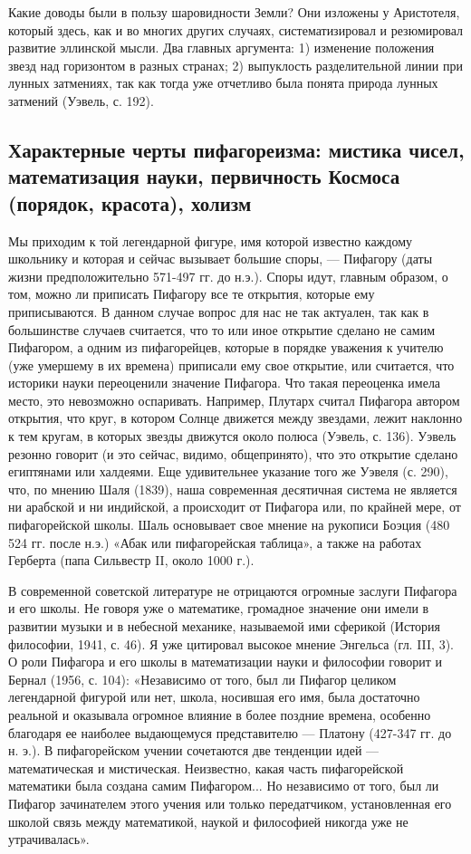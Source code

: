 Какие доводы были в пользу шаровидности Земли? Они изложены у
Аристотеля, который здесь, как и во многих других случаях,
систематизировал и резюмировал развитие эллинской мысли. Два главных
аргумента: 1) изменение положения звезд над горизонтом в разных
странах; 2) выпуклость разделительной линии при лунных затмениях, так
как тогда уже отчетливо была понята природа лунных затмений (Уэвель,
с. 192).

\subsection{Характерные черты пифагореизма: мистика чисел,
математизация науки, первичность Космоса (порядок, красота), холизм}

Мы приходим к той легендарной фигуре, имя которой известно каждому
школьнику и которая и сейчас вызывает большие споры, --- Пифагору
(даты жизни предположительно 571-497 гг. до н.э.). Споры идут,
главным образом, о том, можно ли приписать Пифагору все те открытия,
которые ему приписываются. В данном случае вопрос для нас не так
актуален, так как в большинстве случаев считается, что то или иное
открытие сделано не самим Пифагором, а одним из пифагорейцев, которые
в порядке уважения к учителю (уже умершему в их времена) приписали ему
свое открытие, или считается, что историки науки переоценили значение
Пифагора. Что такая переоценка имела место, это невозможно оспаривать.
Например, Плутарх считал Пифагора автором открытия, что круг, в
котором Солнце движется между звездами, лежит наклонно к тем кругам, в
которых звезды движутся около полюса (Уэвель, с. 136). Уэвель резонно
говорит (и это сейчас, видимо, общепринято), что это открытие сделано
египтянами или халдеями. Еще удивительнее указание того же Уэвеля (с.
290), что, по мнению Шаля (1839), наша современная десятичная система
не является ни арабской и ни индийской, а происходит от Пифагора или,
по крайней мере, от пифагорейской школы. Шаль основывает свое мнение
на рукописи Боэция (480 524 гг. после н.э.) «Абак или пифагорейская
таблица», а также на работах Герберта (папа Сильвестр II, около 1000
г.).

В современной советской литературе не отрицаются огромные заслуги
Пифагора и его школы. Не говоря уже о математике, громадное значение
они имели в развитии музыки и в небесной механике, называемой ими
сферикой (История философии, 1941, с. 46). Я уже цитировал высокое
мнение Энгельса (гл. III, 3). О роли Пифагора и его школы в
математизации науки и философии говорит и Бернал (1956, с. 104):
«Независимо от того, был ли Пифагор целиком легендарной фигурой или
нет, школа, носившая его имя, была достаточно реальной и оказывала
огромное влияние в более поздние времена, особенно благодаря ее
наиболее выдающемуся представителю --- Платону (427-347 гг. до н.
э.). В пифагорейском учении сочетаются две тенденции идей ---
математическая и мистическая. Неизвестно, какая часть пифагорейской
математики была создана самим Пифагором... Но независимо от того, был
ли Пифагор зачинателем этого учения или только передатчиком,
установленная его школой связь между математикой, наукой и философией
никогда уже не утрачивалась».

